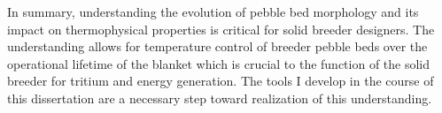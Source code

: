In summary, understanding the evolution of pebble bed morphology and its impact on thermophysical properties is critical for solid breeder designers. The understanding allows for temperature control of breeder pebble beds over the operational lifetime of the blanket which is crucial to the function of the solid breeder for tritium and energy generation. The tools I develop in the course of this dissertation are a necessary step toward realization of this understanding. 


